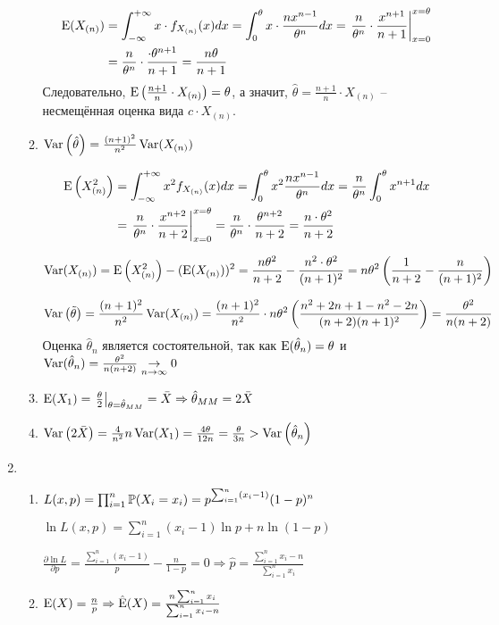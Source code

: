 \begin{enumerate}
\begin{enumerate}
\begin{align*}
\E(X_{(n)}) &= \int_{-\infty}^{+\infty} x \cdot f_{X_{(n)}} (x) dx =  \int_{0}^{\theta}	x \cdot \frac{nx^{n-1}}{\theta^n} dx = \left. \frac{n}{\theta^n} \cdot \frac{x^{n+1}}{n+1} \right|_{x=0}^{x=\theta} \\
&= \frac{n}{\theta^n}  \cdot \frac{\cdot \theta^{n+1}}{n+1} = \frac{n\theta}{n+1}
\end{align*}
Следовательно, $\E \left(\frac{n+1}{n} \cdot X_{(n)}\right) = \theta$, а значит,
$\hat{\theta} = \frac{n+1}{n} \cdot X_{(n)}$ – несмещённая оценка вида $c \cdot  X_{(n)}$.

\item $\Var\left(\hat{\theta}\right) = \frac{(n+1)^2}{n^2} \Var(X_{(n)})$

\begin{align*}
\E\left(X_{(n)}^2\right) &= \int_{-\infty}^{+\infty} x^2 f_{X_{(n)}} (x) dx = \int_{0}^{\theta} x^2 \frac{nx^{n-1}}{\theta^n}  dx = \frac{n}{\theta^n}  \int_{0}^{\theta} x^{n+1} dx \\
&= \left. \frac{n}{\theta^n} \cdot \frac{x^{n+2}}{n+2} \right|_{x=0}^{x=\theta} = \frac{n}{\theta^n} \cdot  \frac{\theta^{n+2}}{n+2} = \frac{n\cdot\theta^2}{n+2}
\end{align*}

\[
\Var(X_{(n)}) = \E\left(X_{(n)}^2\right)  - (\E(X_{(n)}))^2 = \frac{n\theta^2}{n+2} - \frac{n^2 \cdot \theta^2}{(n+1)^2} = n\theta^2 \left(\frac{1}{n+2} - \frac{n}{(n+1)^2}\right)
\]

\[
\Var\left(\tilde{\theta}\right) = \frac{(n+1)^2}{n^2} \Var(X_{(n)}) = \frac{(n+1)^2}{n^2}  \cdot n\theta^2 \left(\frac{n^2+2n+1 - n^2-2n}{(n+2)(n+1)^2} \right) = \frac{\theta^2}{n(n+2)}
\]
Оценка $\hat{\theta}_n$ является состоятельной, так как $\E(\hat{\theta}_n) = \theta$ и $\Var(\hat{\theta}_n) = \frac{\theta^2}{n(n+2)} \underset{n \to \infty}{\to} 0$

\item $\E(X_1) = \left. \frac{\theta}{2} \right|_{\theta = \hat{\theta}_{MM}} = \bar{X} \Rightarrow \hat{\theta}_{MM} = 2\bar{X}$
\item $\Var\left(2\bar{X}\right) = \frac{4}{n^2}n\Var(X_1) = \frac{4\theta}{12n} = \frac{\theta}{3n} > \Var\left(\hat{\theta}_n\right)$
\end{enumerate}
\item
\begin{enumerate}
\item $L(x, p) = \prod_{i=1}^n \P(X_i = x_i) = p^{\sum_{i=1}^n(x_i-1)} (1-p)^n$

$\ln L (x, p) = \sum_{i=1}^n(x_i-1) \ln p  + n\ln(1-p)$

$\frac{\partial \ln L}{\partial p} = \frac{\sum_{i=1}^n(x_i-1)}{p} - \frac{n}{1-p} = 0 \Rightarrow \hat{p} = \frac{\sum_{i=1}^n x_i - n}{\sum_{i=1}^n x_i}$
\item $\E(X) = \frac{n}{p} \Rightarrow \hat{\E}(X) = \frac{n\sum_{i=1}^n x_i}{\sum_{i=1}^n x_i - n}$
\end{enumerate}
\end{enumerate}

